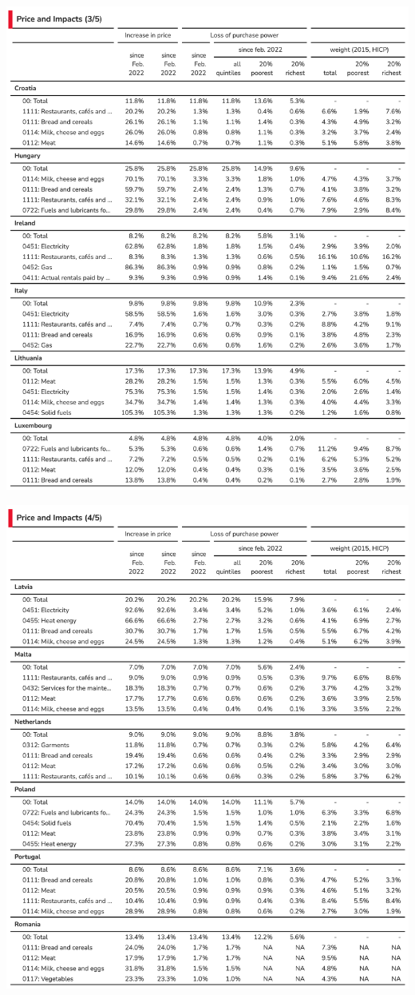\documentclass[
  9pt,
  a4paper,
  numbers=noendperiod,
  DIV=12]{scrartcl}
\begin{document}
\includegraphics{svg/annex_3.png}

\includegraphics{svg/annex_4.png}
\end{document}
